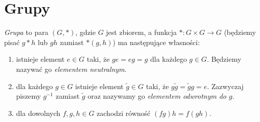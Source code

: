 \documentclass{article}
\begin{document}
\section{Grupy}
\emph{Grupa} to para $(G, *)$, gdzie $G$ jest zbiorem, a funkcja $*: G\times G\to G$ (będziemy pisać $g*h$ lub $gh$ zamiast $*(g,h)$) ma następujące własności:
\begin{enumerate}
  \item istnieje element $e\in G$ taki, że $ge=eg=g$ dla każdego $g\in G$. Będziemy nazywać go \emph{elementem neutralnym}.
  \item dla każdego $g\in G$ istnieje element $\tilde g\in G$ taki, że $g\tilde g=\tilde g g=e.$ Zazwyczaj piszemy $g^{-1}$ zamiast $\tilde g$ oraz nazywamy go
  \emph{elementem odwrotnym do $g$}.
  \item dla dowolnych $f, g, h\in G$ zachodzi równość $(fg)h=f(gh)$.
\end{enumerate}
\end{document}
